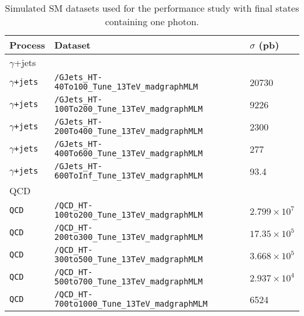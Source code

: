  
\begin{table}[ht!]
\def\arraystretch{1.2}
\caption{Simulated SM datasets used for the \ptmiss performance study with final states containing one photon.}
    \label{tab:METphotonsamples}
    \begin{center}
        \begin{tabular}{|l l l|}
        \hline \hline   
        Process     &  Dataset  &  $\sigma$ (pb)          \\\hline        
        $\gamma$+jets     &    &            \\
        \scriptsize{\texttt{$\gamma$+jets}}     & \scriptsize{\texttt{/GJets\_HT-40To100\_Tune\_13TeV\_madgraphMLM}}          &  \scriptsize{20730}      \\
        \scriptsize{\texttt{$\gamma$+jets}}     & \scriptsize{\texttt{/GJets\_HT-100To200\_Tune\_13TeV\_madgraphMLM}}         &  \scriptsize{9226}      \\
        \scriptsize{\texttt{$\gamma$+jets}}     & \scriptsize{\texttt{/GJets\_HT-200To400\_Tune\_13TeV\_madgraphMLM}}         &  \scriptsize{2300}      \\
        \scriptsize{\texttt{$\gamma$+jets}}     & \scriptsize{\texttt{/GJets\_HT-400To600\_Tune\_13TeV\_madgraphMLM}}         &  \scriptsize{277}      \\
        \scriptsize{\texttt{$\gamma$+jets}}     & \scriptsize{\texttt{/GJets\_HT-600ToInf\_Tune\_13TeV\_madgraphMLM}}         &  \scriptsize{93.4}      \\
        QCD     &    &            \\
        \scriptsize{\texttt{QCD}}             & \scriptsize{\texttt{/QCD\_HT-100to200\_Tune\_13TeV\_madgraphMLM}}           &  \scriptsize{$2.799\times10^7$}       \\
        \scriptsize{\texttt{QCD}}             & \scriptsize{\texttt{/QCD\_HT-200to300\_Tune\_13TeV\_madgraphMLM}}           &  \scriptsize{$17.35\times10^5$}       \\
        \scriptsize{\texttt{QCD}}             & \scriptsize{\texttt{/QCD\_HT-300to500\_Tune\_13TeV\_madgraphMLM}}           &  \scriptsize{$3.668\times10^5$}       \\
        \scriptsize{\texttt{QCD}}             & \scriptsize{\texttt{/QCD\_HT-500to700\_Tune\_13TeV\_madgraphMLM}}           &  \scriptsize{$2.937\times10^4$}       \\
        \scriptsize{\texttt{QCD}}             & \scriptsize{\texttt{/QCD\_HT-700to1000\_Tune\_13TeV\_madgraphMLM}}          &  \scriptsize{6524}       \\

\end{tabular}
\end{center}
\end{table}
